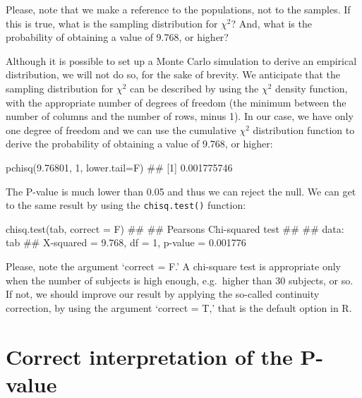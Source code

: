 \documentclass[a4paper,12pt,oneside]{book}
\newenvironment{Shaded}{\begin{snugshade}}{\end{snugshade}}
\newcommand{\DecValTok}[1]{#1}
\newcommand{\FloatTok}[1]{#1}
\newcommand{\DocumentationTok}[1]{#1}
\newcommand{\FunctionTok}[1]{#1}
\newcommand{\AttributeTok}[1]{#1}
\newcommand{\NormalTok}[1]{#1}
\begin{document}
Please, note that we make a reference to the populations, not to the samples. If this is true, what is the sampling distribution for \(\chi^2\)? And, what is the probability of obtaining a value of 9.768, or higher?

Although it is possible to set up a Monte Carlo simulation to derive an empirical distribution, we will not do so, for the sake of brevity. We anticipate that the sampling distribution for \(\chi^2\) can be described by using the \(\chi^2\) density function, with the appropriate number of degrees of freedom (the minimum between the number of columns and the number of rows, minus 1). In our case, we have only one degree of freedom and we can use the cumulative \(\chi^2\) distribution function to derive the probability of obtaining a value of 9.768, or higher:

\begin{Shaded}
\begin{Highlighting}[]
\FunctionTok{pchisq}\NormalTok{(}\FloatTok{9.76801}\NormalTok{, }\DecValTok{1}\NormalTok{, }\AttributeTok{lower.tail=}\NormalTok{F)}
\DocumentationTok{\#\# [1] 0.001775746}
\end{Highlighting}
\end{Shaded}

The P-value is much lower than 0.05 and thus we can reject the null. We can get to the same result by using the \texttt{chisq.test()} function:

\begin{Shaded}
\begin{Highlighting}[]
\FunctionTok{chisq.test}\NormalTok{(tab, }\AttributeTok{correct =}\NormalTok{ F)}
\DocumentationTok{\#\# }
\DocumentationTok{\#\#  Pearson\textquotesingle{}s Chi{-}squared test}
\DocumentationTok{\#\# }
\DocumentationTok{\#\# data:  tab}
\DocumentationTok{\#\# X{-}squared = 9.768, df = 1, p{-}value = 0.001776}
\end{Highlighting}
\end{Shaded}

Please, note the argument `correct = F.' A chi-square test is appropriate only when the number of subjects is high enough, e.g.~higher than 30 subjects, or so. If not, we should improve our result by applying the so-called continuity correction, by using the argument `correct = T,' that is the default option in R.

\hypertarget{correct-interpretation-of-the-p-value}{%
\section{Correct interpretation of the P-value}\label{correct-interpretation-of-the-p-value}}
\end{document}
